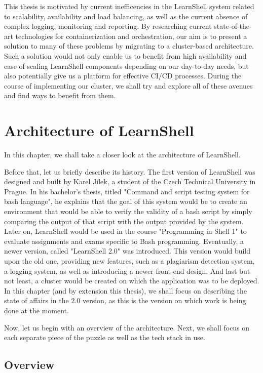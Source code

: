\documentclass[thesis=B,english]{FITthesis}[2019/12/23]
\begin{document}
This thesis is motivated by current inefficencies in the LearnShell system related to scalability, availability and load balancing, as well as the current absence of complex logging, monitoring and reporting. By researching current state-of-the-art technologies for containerization and orchestration, our aim is to present a solution to many of these problems by migrating to a cluster-based architecture. Such a solution would not only enable us to benefit from high availability and ease of scaling LearnShell components depending on our day-to-day needs, but also potentially give us a platform for effective CI/CD processes. During the course of implementing our cluster, we shall try and explore all of these avenues and find ways to benefit from them.


\chapter{Architecture of LearnShell}

In this chapter, we shall take a closer look at the architecture of LearnShell.

Before that, let us briefly describe its history. The first version of LearnShell was designed and built by Karel Jilek, a student of the Czech Technical University in Prague. In his bachelor's thesis, titled "Command and script testing system for bash language", he explains that the goal of this system would be to create an environment that would be able to verify the validity of a bash script by simply comparing the output of that script with the output provided by the system. \cite{learnshell-jilek} Later on, LearnShell would be used in the course "Programming in Shell 1" to evaluate assignments and exams specific to Bash programming. Eventually, a newer version, called "LearnShell 2.0" was introduced. This version would build upon the old one, providing new features, such as a plagiarism detection system, a logging system, as well as introducing a newer front-end design. And last but not least, a cluster would be created on which the application was to be deployed. In this chapter (and by extension this thesis), we shall focus on describing the state of affairs in the 2.0 version, as this is the version on which work is being done at the moment.

Now, let us begin with an overview of the architecture. Next, we shall focus on each separate piece of the puzzle as well as the tech stack in use.

\section{Overview}
\end{document}
